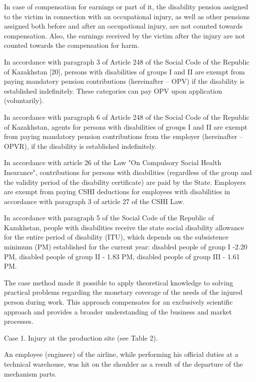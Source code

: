 \begin{multicols}{2}
In case of compensation for earnings or part of it, the disability
pension assigned to the victim in connection with an occupational
injury, as well as other pensions assigned both before and after an
occupational injury, are not counted towards compensation. Also, the
earnings received by the victim after the injury are not counted towards
the compensation for harm.

In accordance with paragraph 3 of Article 248 of the Social Code of the
Republic of Kazakhstan {[}20{]}, persons with disabilities of groups I
and II are exempt from paying mandatory pension contributions
(hereinafter -- OPV) if the disability is established indefinitely.
These categories can pay OPV upon application (voluntarily).

In accordance with paragraph 6 of Article 248 of the Social Code of the
Republic of Kazakhstan, agents for persons with disabilities of groups I
and II are exempt from paying mandatory pension contributions from the
employer (hereinafter -- OPVR), if the disability is established
indefinitely.

In accordance with article 26 of the Law "On Compulsory Social Health
Insurance", contributions for persons with disabilities (regardless of
the group and the validity period of the disability certificate) are
paid by the State. Employers are exempt from paying CSHI deductions for
employees with disabilities in accordance with paragraph 3 of article 27
of the CSHI Law.

In accordance with paragraph 5 of the Social Code of the Republic of
Kazakhstan, people with disabilities receive the state social disability
allowance for the entire period of disability (ITU), which depends on
the subsistence minimum (PM) established for the current year: disabled
people of group I -2.20 PM, disabled people of group II - 1.83 PM,
disabled people of group III - 1.61 PM.

The case method made it possible to apply theoretical knowledge to
solving practical problems regarding the monetary coverage of the needs
of the injured person during work. This approach compensates for an
exclusively scientific approach and provides a broader understanding of
the business and market processes.

Case 1. Injury at the production site (see Table 2).

An employee (engineer) of the airline, while performing his official
duties at a technical warehouse, was hit on the shoulder as a result of
the departure of the mechanism parts.


\end{multicols}
